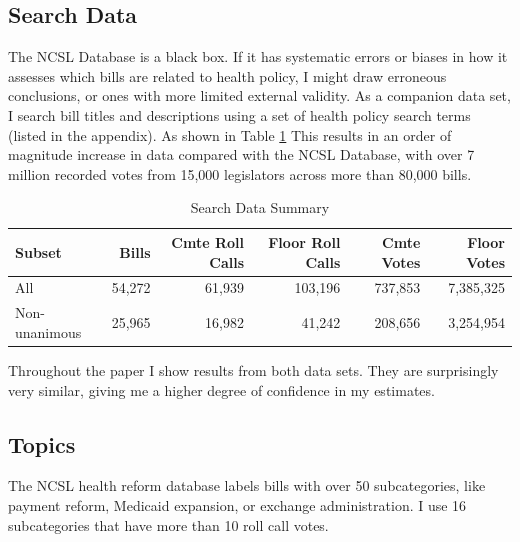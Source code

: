 \documentclass[
  oneside]{book}
\begin{document}
\hypertarget{search-data}{%
\subsection{Search Data}\label{search-data}}

The NCSL Database is a black box. If it has systematic errors or biases in how it assesses which bills are related to health policy, I might draw erroneous conclusions, or ones with more limited external validity. As a companion data set, I search bill titles and descriptions using a set of health policy search terms (listed in the appendix). As shown in Table \ref{tab:search-summary} This results in an order of magnitude increase in data compared with the NCSL Database, with over 7 million recorded votes from 15,000 legislators across more than 80,000 bills.

\begin{table}

\caption{\label{tab:search-summary}Search Data Summary}
\centering
\begin{tabular}[t]{lrrrrr}
\toprule
Subset & Bills & Cmte Roll Calls & Floor Roll Calls & Cmte Votes & Floor Votes\\
\midrule
All & 54,272 & 61,939 & 103,196 & 737,853 & 7,385,325\\
Non-unanimous & 25,965 & 16,982 & 41,242 & 208,656 & 3,254,954\\
\bottomrule
\end{tabular}
\end{table}

Throughout the paper I show results from both data sets. They are surprisingly very similar, giving me a higher degree of confidence in my estimates.

\hypertarget{topics}{%
\subsection{Topics}\label{topics}}

The NCSL health reform database labels bills with over 50 subcategories, like payment reform, Medicaid expansion, or exchange administration. I use 16 subcategories that have more than 10 roll call votes.
\end{document}
